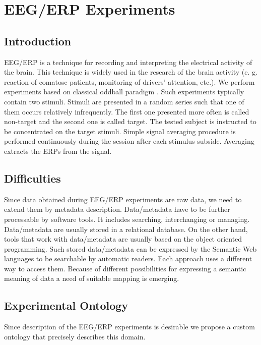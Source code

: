 \documentclass[conference]{IEEEtran}
\begin{document}
\section{EEG/ERP Experiments}

\subsection{Introduction}

EEG/ERP is a technique for recording and interpreting the electrical activity of the brain. This technique is widely used in the research of the brain activity (e. g. reaction of comatose patients, monitoring of drivers' attention, etc.). We perform experiments based on classical oddball paradigm \cite{Introduction-to-ERP}. Such experiments typically contain two stimuli.
Stimuli are presented in a random series such that one of them occurs relatively infrequently. The first one presented more often is called non-target and the second one is called target. The tested subject is instructed to be concentrated on the target stimuli. Simple signal averaging procedure is performed continuously during the session after each stimulus subside. Averaging extracts the ERPs from the signal.

\subsection{\label{Difficulties}Difficulties}

Since data obtained during EEG/ERP experiments are raw data, we need to extend them by metadata description. Data/metadata have to be further processable by software tools. It includes searching, interchanging or managing. Data/metadata are usually stored in a relational database. On the other hand, tools that
work with data/metadata are usually based on the object oriented programming. Such stored data/metadata can be expressed by the Semantic Web languages to be searchable by automatic readers. Each approach uses a different way to access them. Because of different possibilities for expressing a semantic meaning of data a need of suitable mapping is emerging.

\subsection{\label{Experimental Ontology}Experimental Ontology}

Since description of the EEG/ERP experiments is desirable we propose a custom ontology that precisely describes this domain.
\end{document}
